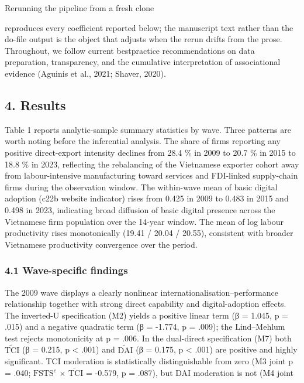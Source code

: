 \documentclass[12pt,a4paper]{article}
\begin{document}
Rerunning the pipeline from a fresh clone

reproduces every coefficient reported below; the manuscript text rather
than the do-file output is the object that adjusts when the rerun drifts
from the prose. Throughout, we follow current bestpractice
recommendations on data preparation, transparency, and the cumulative
interpretation of associational evidence (Aguinis et al., 2021; Shaver,
2020).

\hypertarget{4-results}{%
\subsection{4. Results}\label{4-results}}

Table 1 reports analytic-sample summary statistics by wave. Three
patterns are worth noting before the inferential analysis. The share of
firms reporting any positive direct-export intensity declines from 28.4
\% in 2009 to 20.7 \% in 2015 to 18.8 \% in 2023, reflecting the
rebalancing of the Vietnamese exporter cohort away from labour-intensive
manufacturing toward services and FDI-linked supply-chain firms during
the observation window. The within-wave mean of basic digital adoption
(c22b website indicator) rises from 0.425 in 2009 to 0.483 in 2015 and
0.498 in 2023, indicating broad diffusion of basic digital presence
across the Vietnamese firm population over the 14-year window. The mean
of log labour productivity rises monotonically (19.41 / 20.04 / 20.55),
consistent with broader Vietnamese productivity convergence over the
period.

\hypertarget{41-wave-specific-findings}{%
\subsubsection{4.1 Wave-specific
findings}\label{41-wave-specific-findings}}

The 2009 wave displays a clearly nonlinear
internationalisation--performance relationship together with strong
direct capability and digital-adoption effects. The inverted-U
specification (M2) yields a positive linear term (β = 1.045, p = .015)
and a negative quadratic term (β = -1.774, p = .009); the Lind--Mehlum
test rejects monotonicity at p = .006. In the dual-direct specification
(M7) both \(\tilde{\mathrm{TCI}}\) (β = 0.215, p \textless{} .001) and
\(\tilde{\mathrm{DAI}}\) (β = 0.175, p \textless{} .001) are positive
and highly significant. TCI moderation is statistically distinguishable
from zero (M3 joint p = .040; \(\mathrm{FSTS}^{c}\) ×
\(\tilde{\mathrm{TCI}}\) = -0.579, p = .087), but DAI moderation is not
(M4 joint
\end{document}
